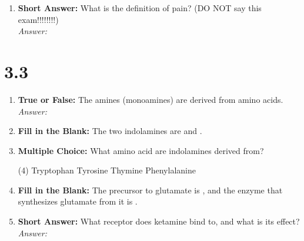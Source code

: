\begin{enumerate}[label=\textbf{Q3.2.\arabic*}]
    \item \textbf{Short Answer:} What is the definition of pain? (DO NOT say this exam!!!!!!!!) \\
        \textit{Answer:} \\%
\end{enumerate}

\squigglyline
\section*{3.3}

\begin{enumerate}[label=\textbf{Q3.3.\arabic*}]
    \item \textbf{True or False:} The amines (monoamines) are derived from amino acids. \\
        \textit{Answer:} %

    \item \textbf{Fill in the Blank:} The two indolamines are \underline{\hspace{3cm}} and \underline{\hspace{3cm}}.

    \item \textbf{Multiple Choice:} What amino acid are indolamines derived from?
        \begin{tasks}[label=\textcolor{\documentTheme}{(\Alph*)}, item-format=\color{\documentTheme}, label-width=1.5em, item-indent=1.7em](4)
            \task Tryptophan
            \task Tyrosine
            \task Thymine
            \task Phenylalanine
        \end{tasks}
    
    \item \textbf{Fill in the Blank:} The precursor to glutamate is \underline{\hspace{3cm}}, and the enzyme that synthesizes glutamate from it is \underline{\hspace{3cm}}.

    \item \textbf{Short Answer:} What receptor does ketamine bind to, and what is its effect? \\
        \textit{Answer:} \\%


\end{enumerate}
